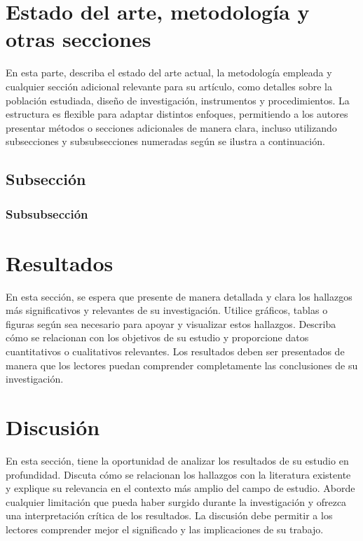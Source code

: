 \documentclass[fleqn]{Paquetes/RevDigMatEduInt}
\begin{document}
\section{Estado del arte, metodología y otras secciones}\label{sec:seccion}
En esta parte, describa el estado del arte actual, la metodología empleada y cualquier sección adicional relevante para su artículo, como detalles sobre la población estudiada, diseño de investigación, instrumentos y procedimientos. La estructura es flexible para adaptar distintos enfoques, permitiendo a los autores presentar métodos o secciones adicionales de manera clara, incluso utilizando subsecciones y subsubsecciones numeradas según se ilustra a continuación.


\subsection{Subsección}

\subsubsection{Subsubsección}


\section{Resultados} \label{sec:resultados}
En esta sección, se espera que presente de manera detallada y clara los hallazgos más significativos y relevantes de su investigación. Utilice gráficos, tablas o figuras según sea necesario para apoyar y visualizar estos hallazgos. Describa cómo se relacionan con los objetivos de su estudio y proporcione datos cuantitativos o cualitativos relevantes. Los resultados deben ser presentados de manera que los lectores puedan comprender completamente las conclusiones de su investigación.



\section{Discusión} \label{sec:discusion}
En esta sección, tiene la oportunidad de analizar los resultados de su estudio en profundidad. Discuta cómo se relacionan los hallazgos con la literatura existente y explique su relevancia en el contexto más amplio del campo de estudio. Aborde cualquier limitación que pueda haber surgido durante la investigación y ofrezca una interpretación crítica de los resultados. La discusión debe permitir a los lectores comprender mejor el significado y las implicaciones de su trabajo.
\end{document}
